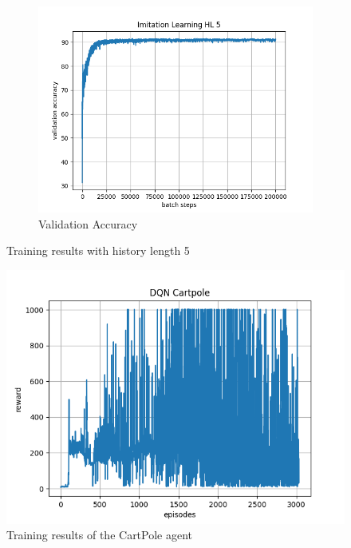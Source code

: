 \documentclass[10pt]{scrartcl}
\begin{document}
\begin{figure}[h]
\begin{subfigure}{0.5\textwidth}
      \includegraphics[width=\linewidth]{images/Il_hl5_valid.png}
      \caption{Validation Accuracy}
      \label{fig:Il_hl5_valid}
    \end{subfigure}
    \caption{Training results with history length 5}
    \label{fig:Il_hl5}
\end{figure}
\begin{figure}[h]
    \centering
    \includegraphics[width=0.5\linewidth]{images/RL_cp.png}
    \caption{Training results of the CartPole agent}
    \label{fig:Rl_cp}
\end{figure}
\end{document}

